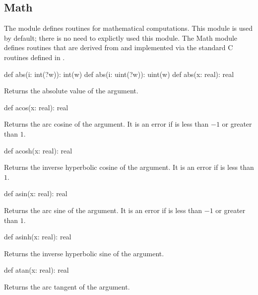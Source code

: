 \subsection{Math}
\label{Math}

The module  defines routines for mathematical computations.
This module is used by default; there is no need to explictly used
this module.  The Math module defines routines that are derived from
and implemented via the standard C routines defined in .

\vspace{1pc}

\begin{protohead}
def abs(i: int(?w)): int(w)
def abs(i: uint(?w)): uint(w)
def abs(x: real): real
\end{protohead}
\begin{protobody}
Returns the absolute value of the argument.
\end{protobody}

\begin{protohead}
def acos(x: real): real
\end{protohead}
\begin{protobody}
Returns the arc cosine of the argument.  It is an error if  is
less than $-1$ or greater than $1$.
\end{protobody}

\begin{protohead}
def acosh(x: real): real
\end{protohead}
\begin{protobody}
Returns the inverse hyperbolic cosine of the argument.  It is an error
if  is less than $1$.
\end{protobody}

\begin{protohead}
def asin(x: real): real
\end{protohead}
\begin{protobody}
Returns the arc sine of the argument.  It is an error if  is
less than $-1$ or greater than $1$.
\end{protobody}

\begin{protohead}
def asinh(x: real): real
\end{protohead}
\begin{protobody}
Returns the inverse hyperbolic sine of the argument.
\end{protobody}

\begin{protohead}
def atan(x: real): real
\end{protohead}
\begin{protobody}
Returns the arc tangent of the argument.
\end{protobody}


